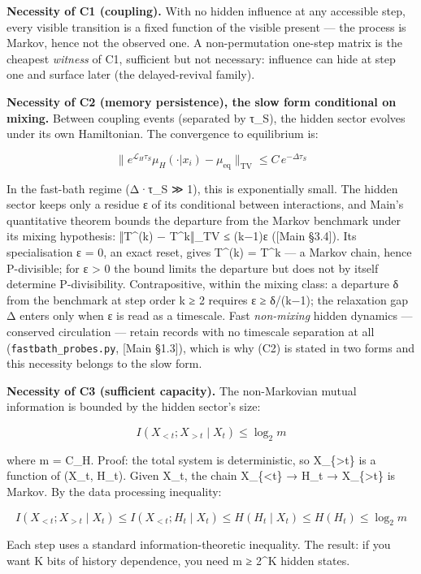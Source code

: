 \documentclass[
]{article}
\begin{document}
\textbf{Necessity of C1 (coupling).} With no hidden influence at any
accessible step, every visible transition is a fixed function of the
visible present --- the process is Markov, hence not the observed one. A
non-permutation one-step matrix is the cheapest \emph{witness} of C1,
sufficient but not necessary: influence can hide at step one and surface
later (the delayed-revival family).

\textbf{Necessity of C2 (memory persistence), the slow form conditional
on mixing.} Between coupling events (separated by τ\_S), the hidden
sector evolves under its own Hamiltonian. The convergence to equilibrium
is:

\[\| e^{\mathcal{L}_H \tau_S} \mu_H(\cdot | x_i) - \mu_{\text{eq}} \|_{\text{TV}} \leq C \, e^{-\Delta \tau_S}\]

In the fast-bath regime (Δ·τ\_S ≫ 1), this is exponentially small. The
hidden sector keeps only a residue ε of its conditional between
interactions, and Main's quantitative theorem bounds the departure from
the Markov benchmark under its mixing hypothesis: ‖T\^{}(k) −
T\^{}k‖\_TV ≤ (k−1)ε ({[}Main §3.4{]}). Its specialisation ε = 0, an
exact reset, gives T\^{}(k) = T\^{}k --- a Markov chain, hence
P-divisible; for ε \textgreater{} 0 the bound limits the departure but
does not by itself determine P-divisibility. Contrapositive, within the
mixing class: a departure δ from the benchmark at step order k ≥ 2
requires ε ≥ δ/(k−1); the relaxation gap Δ enters only when ε is read as
a timescale. Fast \emph{non-mixing} hidden dynamics --- conserved
circulation --- retain records with no timescale separation at all
(\texttt{fastbath\_probes.py}, {[}Main §1.3{]}), which is why (C2) is
stated in two forms and this necessity belongs to the slow form.

\textbf{Necessity of C3 (sufficient capacity).} The non-Markovian mutual
information is bounded by the hidden sector's size:

\[I(X_{<t} ; X_{>t} \mid X_t) \leq \log_2 m\]

where m = \textbar C\_H\textbar. Proof: the total system is
deterministic, so X\_\{\textgreater t\} is a function of (X\_t, H\_t).
Given X\_t, the chain X\_\{\textless t\} → H\_t → X\_\{\textgreater t\}
is Markov. By the data processing inequality:

\[I(X_{<t} ; X_{>t} \mid X_t) \leq I(X_{<t} ; H_t \mid X_t) \leq H(H_t \mid X_t) \leq H(H_t) \leq \log_2 m\]

Each step uses a standard information-theoretic inequality. The result:
if you want K bits of history dependence, you need m ≥ 2\^{}K hidden
states.
\end{document}
